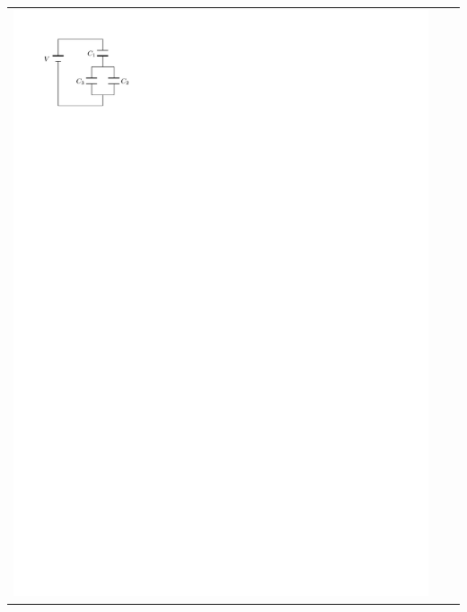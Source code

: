 \documentclass{article}
\begin{document}
\begin{tabularx}{\textwidth}{X | X | X}
      \includegraphics{figures/capacitors-in-mix.pdf}
    \end{tabularx}
\end{document}
